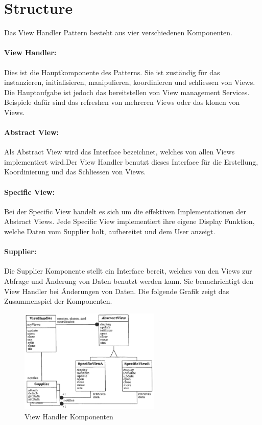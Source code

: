 \section{Structure}
Das View Handler Pattern besteht aus vier verschiedenen Komponenten.
\paragraph{View Handler:} Dies ist die Hauptkomponente des Patterns. Sie ist zuständig für das instanzieren, initialisieren, manipulieren, koordinieren und schliessen von Views. Die Hauptaufgabe ist jedoch das bereitstellen von View management Services. Beispiele dafür sind das refreshen von mehreren Views oder das klonen von Views.
\paragraph{Abstract View:} Als Abstract View wird das Interface bezeichnet, welches von allen Views implementiert wird.Der View Handler benutzt dieses Interface für die Erstellung, Koordinierung und das Schliessen von Views. 
\paragraph{Specific View:} Bei der Specific View handelt es sich um die effektiven Implementationen der Abstract Views. Jede Specific View implementiert ihre eigene Display Funktion, welche Daten vom Supplier holt, aufbereitet und dem User anzeigt.
\paragraph{Supplier:} Die Supplier Komponente stellt ein Interface bereit, welches von den Views zur Abfrage und Änderung von Daten benutzt werden kann. Sie benachrichtigt den View Handler bei Änderungen von Daten.
Die folgende Grafik zeigt das Zusammenspiel der Komponenten.
\begin{figure}[H]
	\centering
	\includegraphics[width=0.6\textwidth]{figures/10-viewhandler-1.png}
	\caption{View Handler Komponenten}
\end{figure}

